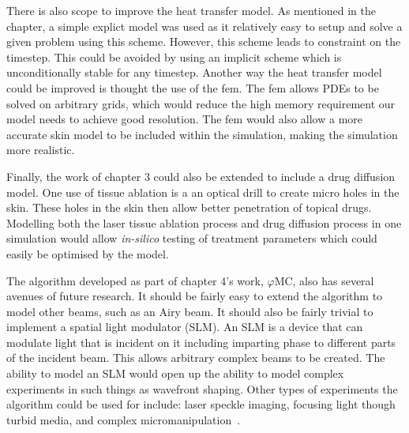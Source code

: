 There is also scope to improve the heat transfer model.
As mentioned in the chapter, a simple explict model was used as it relatively easy to setup and solve a given problem using this scheme.
However, this scheme leads to constraint on the timestep.
This could be avoided by using an implicit scheme which is unconditionally stable for any timestep.
Another way the heat transfer model could be improved is thought the use of the \gls*{fem}.
The \gls*{fem} allows PDEs to be solved on arbitrary grids, which would reduce the high memory requirement our model needs to achieve good resolution.
The \gls*{fem} would also allow a more accurate skin model to be included within the simulation, making the simulation more realistic.

Finally, the work of chapter 3 could also be extended to include a drug diffusion model.
One use of tissue ablation is a an optical drill to create micro holes in the skin. 
These holes in the skin then allow better penetration of topical drugs.
Modelling both the laser tissue ablation process and drug diffusion process in one simulation would allow \textit{in-silico} testing of treatment parameters which could easily be optimised by the model.

\medskip

The algorithm developed as part of chapter 4's work, $\varphi$MC, also has several avenues of future research.
It should be fairly easy to extend the algorithm to model other beams, such as an Airy beam.
It should also be fairly trivial to implement a spatial light modulator (SLM)\@.
An SLM is a device that can modulate light that is incident on it including imparting phase to different parts of the incident beam.
This allows arbitrary complex beams to be created.
The ability to model an SLM would open up the ability to model complex experiments in such things as wavefront shaping.
Other types of experiments the algorithm could be used for include: laser speckle imaging, focusing light though turbid media, and complex micromanipulation~\cite{vellekoop2007focusing,horstmeyer2015guidestar,vcivzmar2010situ}.

\medskip

